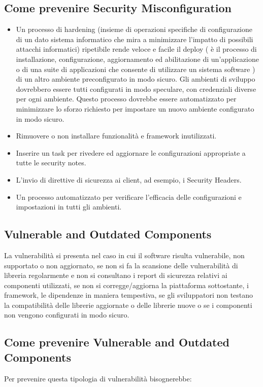 \subsection{Come prevenire Security Misconfiguration}
\begin{itemize}
    \item Un processo di hardening (insieme di operazioni specifiche di configurazione di un dato sistema informatico che mira a minimizzare l’impatto di possibili attacchi informatici) ripetibile rende veloce e facile il deploy ( è il processo di installazione, configurazione, aggiornamento ed abilitazione di un’applicazione o di una suite di applicazioni che consente di utilizzare un sistema software ) di un altro ambiente preconfigurato in modo sicuro. Gli ambienti di sviluppo dovrebbero essere tutti configurati in modo speculare, con credenziali diverse per ogni ambiente. Questo processo dovrebbe essere automatizzato per minimizzare lo sforzo richiesto per impostare un nuovo ambiente configurato in modo sicuro.
    \item Rimuovere o non installare funzionalità e framework inutilizzati.
    \item Inserire un task per rivedere ed aggiornare le configurazioni appropriate a tutte le security notes.
    \item L'invio di direttive di sicurezza ai client, ad esempio, i Security Headers.
    \item Un processo automatizzato per verificare l'efficacia delle configurazioni e impostazioni in tutti gli ambienti.
\end{itemize}
\subsection{Vulnerable and Outdated Components}
La vulnerabilità si presenta nel caso in cui il software risulta vulnerabile, non supportato o non aggiornato, se non si fa la scansione delle vulnerabilità di libreria regolarmente e non si consultano i report di sicurezza relativi ai componenti utilizzati, se non si corregge/aggiorna la piattaforma sottostante, i framework, le dipendenze in maniera tempestiva, se gli sviluppatori non testano la compatibilità delle librerie aggiornate o delle librerie nuove o se i componenti non vengono configurati in modo sicuro.
\subsection{Come prevenire Vulnerable and Outdated Components}
Per prevenire questa tipologia di vulnerabilità bisognerebbe: 

